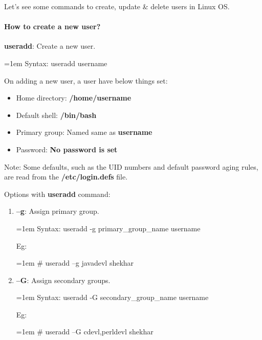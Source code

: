 \setlength{\columnsep}{3pt}
\begin{flushleft}
	
	Let's see some commands to create, update \& delete users in Linux OS.
	
	\paragraph{How to create a new user?}
	\bigskip
	\textbf{useradd}: Create a new user.
	\begin{tcolorbox}[breakable,notitle,boxrule=1pt,colback=pink,colframe=pink]
		\color{black}
		\font=1em
		Syntax:  useradd username
		\font=4pt
	\end{tcolorbox}
	On adding a new user, a user have below things set:
	\begin{itemize}
		\item Home directory: \textbf{/home/username}
		\item Default shell: \textbf{/bin/bash}
		\item Primary group: Named same as \textbf{username}
		\item Password: \textbf{No password is set}
	\end{itemize}
	
	\begin{tcolorbox}[breakable,notitle,boxrule=1pt,colback=yellow,colframe=yellow]
		\color{black}
		Note: Some defaults, such as the UID numbers and default password aging rules, are read from the \textbf{/etc/login.defs} file.
	\end{tcolorbox}
	
	Options with \textbf{useradd} command:
	\begin{enumerate}[label=(\alph*)]
		\item \textbf{–g}: Assign primary group.
		\bigskip
		\begin{tcolorbox}[breakable,notitle,boxrule=0pt,colback=pink,colframe=pink]
			\color{black}
			\font=1em
			Syntax: useradd -g primary\_group\_name username
			\font=4pt
		\end{tcolorbox}
		Eg:
		\bigskip
		\begin{tcolorbox}[breakable,notitle,boxrule=-0pt,colback=black,colframe=black]
			\color{green}
			\font=1em
			\# useradd –g javadevl shekhar
			\font=4pt
		\end{tcolorbox}
		
		\item \textbf{–G}: Assign secondary groups.
		\bigskip
		\begin{tcolorbox}[breakable,notitle,boxrule=0pt,colback=pink,colframe=pink]
			\color{black}
			\font=1em
			Syntax: useradd -G secondary\_group\_name username
			\font=4pt
		\end{tcolorbox}
		Eg:
		\bigskip
		\begin{tcolorbox}[breakable,notitle,boxrule=-0pt,colback=black,colframe=black]
			\color{green}
			\font=1em
			\# useradd –G cdevl,perldevl shekhar
			\font=4pt
		\end{tcolorbox}
		

\end{enumerate}
\end{flushleft}
